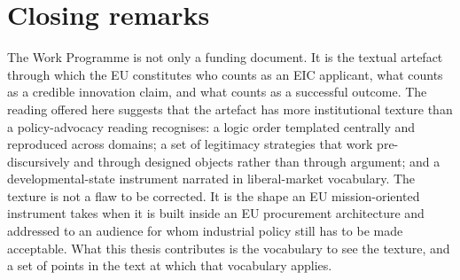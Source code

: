 \section{Closing remarks}
\label{sec:conc-close}

The Work Programme is not only a funding document. It is the textual
artefact through which the EU constitutes who counts as an EIC
applicant, what counts as a credible innovation claim, and what counts
as a successful outcome. The reading offered here suggests that the
artefact has more institutional texture than a policy-advocacy reading
recognises: a logic order templated centrally and reproduced across
domains; a set of legitimacy strategies that work pre-discursively and
through designed objects rather than through argument; and a
developmental-state instrument narrated in liberal-market vocabulary.
The texture is not a flaw to be corrected. It is the shape an EU
mission-oriented instrument takes when it is built inside an EU
procurement architecture and addressed to an audience for whom
industrial policy still has to be made acceptable. What this thesis
contributes is the vocabulary to see the texture, and a set of
points in the text at which that vocabulary applies.
